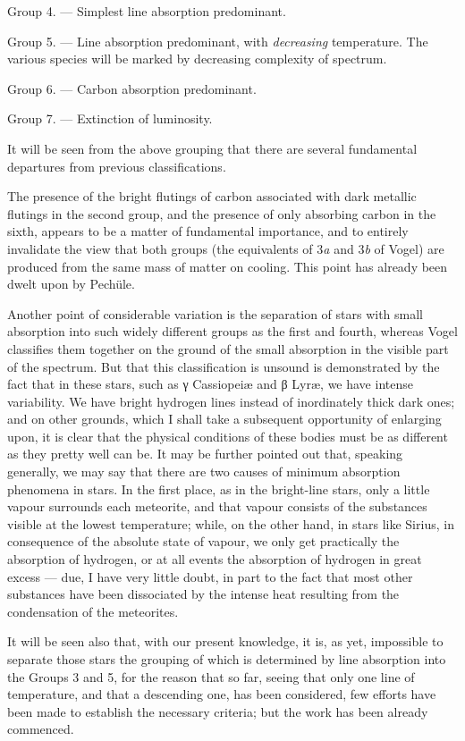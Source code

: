 \documentclass[a4paper, 12pt, oneside, polutonikogreek, english]{article}
\begin{document}
Group 4. --- Simplest line absorption predominant.

Group 5. --- Line absorption predominant, with \emph{decreasing} temperature. The various species will be marked by decreasing complexity of spectrum.

Group 6. --- Carbon absorption predominant.

Group 7. --- Extinction of luminosity.

It will be seen from the above grouping that there are several fundamental departures from previous classifications.

The presence of the bright flutings of carbon associated with dark metallic flutings in the second group, and the presence of only absorbing carbon in the sixth, appears to be a matter of fundamental importance, and to entirely invalidate the view that both groups (the equivalents of 3\emph{a} and 3\emph{b} of Vogel) are produced from the same mass of matter on cooling. This point has already been dwelt upon by Pechüle.

Another point of considerable variation is the separation of stars with small absorption into such widely different groups as the first and fourth, whereas Vogel classifies them together on the ground of the small absorption in the visible part of the spectrum. But that this classification is unsound is demonstrated by the fact that in these stars, such as γ Cassiopeiæ and β Lyræ, we have intense variability. We have bright hydrogen lines instead of inordinately thick dark ones; and on other grounds, which I shall take a subsequent opportunity of enlarging upon, it is clear that the physical conditions of these bodies must be as different as they pretty well can be. It may be further pointed out that, speaking generally, we may say that there are two causes of minimum absorption phenomena in stars. In the first place, as in the bright-line stars, only a little vapour surrounds each meteorite, and that vapour consists of the substances visible at the lowest temperature; while, on the other hand, in stars like Sirius, in consequence of the absolute state of vapour, we only get practically the absorption of hydrogen, or at all events the absorption of hydrogen in great excess --- due, I have very little doubt, in part to the fact that most other substances have been dissociated by the intense heat resulting from the condensation of the meteorites.

It will be seen also that, with our present knowledge, it is, as yet, impossible to separate those stars the grouping of which is determined by line absorption into the Groups 3 and 5, for the reason that so far, seeing that only one line of temperature, and that a descending one, has been considered, few efforts have been made to establish the necessary criteria; but the work has been already commenced.
\clearpage
\end{document}

